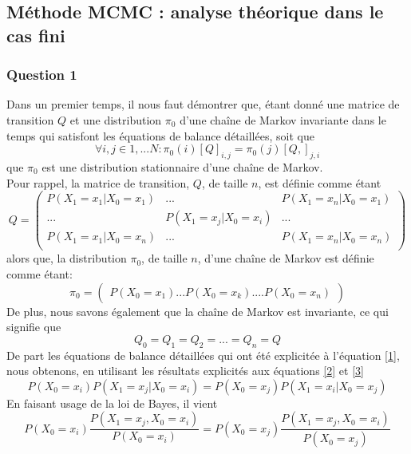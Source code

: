 \documentclass[a4paper, 11pt]{article}
\begin{document}
\subsection{Méthode MCMC : analyse théorique dans le cas fini}
\subsubsection{Question 1}
Dans un premier temps, il nous faut démontrer que, étant donné une matrice de transition $Q$ et une distribution $\pi_0$ d'une chaîne de Markov invariante dans le temps qui satisfont les équations de balance détaillées, soit que
\begin{equation}
    \forall i,j \in { 1,...N} : \pi_0(i) [ Q]_{i,j}=\pi_0(j) [ Q,]_{j,i}
    \label{1}
\end{equation}
que $\pi_0$ est une distribution  stationnaire d'une chaîne de Markov.\\
Pour rappel, la matrice de transition, $Q$, de taille $n$, est définie comme étant
\begin{equation}
Q=
    \begin{pmatrix}
    P(X_1=x_1|X_0=x_1) & ... & P(X_1=x_n|X_0=x_1)\\
    ... & P(X_1=x_j|X_0=x_i) & ...\\
    P(X_1=x_1|X_0=x_n) & ... & P(X_1=x_n|X_0=x_n)\\
    \end{pmatrix}
    \label{2}
\end{equation}
alors que, la distribution $\pi_0$, de taille $n$, d'une chaîne de Markov est définie comme étant:
\begin{equation}
    \pi_0=
    \begin{pmatrix}
    P(X_0=x_1) ...  P(X_0=x_k) .... P(X_0=x_n)
    \end{pmatrix}
    \label{3}
    \end{equation}
De  plus, nous savons également que la chaîne de Markov est invariante, ce qui signifie que 
$$Q_0=Q_1=Q_2=...=Q_n=Q$$
De part les équations de balance détaillées qui ont été explicitée à l'équation \ref{1}, nous obtenons, en utilisant les résultats explicités aux équations \ref{2} et \ref{3} 
\begin{equation}
    P(X_0=x_i)P(X_1=x_j|X_0=x_i)=P(X_0=x_j)P(X_1=x_i|X_0=x_j)
\end{equation}
En faisant usage de la loi de Bayes, il vient
\begin{equation}
    P(X_0=x_i) \frac{P(X_1=x_j,X_0=x_i)}{P(X_0=x_i)}=P(X_0=x_j) \frac{P(X_1=x_j,X_0=x_i)}{P(X_0=x_j)}
\end{equation}
\end{document}
